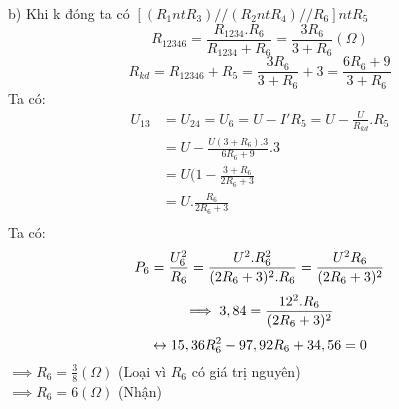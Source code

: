 \documentclass[15pt]{article}
\begin{document}
b) Khi k đóng ta có $[(R_{1} nt R_{3}) // (R_{2} nt R_{4}) // R_{6}] nt R_{5}$\\
\begin{equation*}
    R_{12346} = \frac{R_{1234}.R_{6}}{R_{1234} + R_{6}} = \frac{3R_{6}}{3 + R_{6}} (\Omega)
\end{equation*}
\begin{equation*}
    R_{kd} = R_{12346} + R_{5} = \frac{3R_{6}}{3 + R_{6}} + 3 = \frac{6R_{6} + 9}{3 + R_{6}}
\end{equation*}
Ta có:
\begin{equation*}
    \begin{aligned}
        U_{13} & = U_{24} = U_{6} = U - I'R_{5} = U - \frac{U}{R_{kd}}.R_{5} \\
               & = U - \frac{U(3 + R_{6}).3}{6R_{6} + 9}.3 \\
               & = U(1 - \frac{3 + R_{6}}{2R_{6} + 3} \\
               & = U.\frac{R_{6}}{2R_{6} + 3} \\
    \end{aligned}
\end{equation*}
Ta có:
\begin{equation*}
P_{6} = \frac{U_{6}^2}{R_{6}} = \frac{U^2.R_{6}^2}{(2R_{6} + 3)^2.R_{6}} = \frac{U^2R_{6}}{(2R_{6} + 3)^2}\\
\end{equation*}
\begin{equation*}
    \implies 3,84 = \frac{12^2.R_{6}}{(2R_{6} + 3)^2}\\
\end{equation*}
\begin{equation*}
    \leftrightarrow 15,36R_{6}^2 - 97,92R_{6} + 34,56 = 0\\
\end{equation*}
$\implies R_{6} = \frac{3}{8} (\Omega)$ (Loại vì $R_{6}$ có giá trị nguyên)\\
$\implies R_{6} = 6 (\Omega)$ (Nhận)\\
\end{document}
